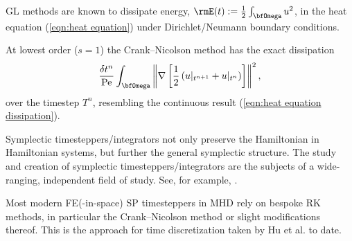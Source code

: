     \line
    
    \begin{example}
        GL methods are known to dissipate energy, $\rmE(t)  :=  \frac{1}{2}\int_{\bfOmega}u^{2}$, in the heat equation (\ref{eqn:heat equation}) under Dirichlet/Neumann boundary conditions.
        
        At lowest order ($s  =  1$) the Crank--Nicolson method has the exact dissipation
        \begin{equation}\label{eqn:heat equation dissipation implicit midpoint}
            \frac{\delta t^{n}}{\rmPe}\int_{\bfOmega}\left\|\nabla\left[\frac{1}{2}\left(u|_{t^{n + 1}} + u|_{t^{n}}\right)\right]\right\|^{2},
        \end{equation}
        over the timestep $T^{n}$, resembling the continuous result (\ref{eqn:heat equation dissipation}).
    \end{example}
    
    \begin{example}
        Symplectic timesteppers/integrators not only preserve the Hamiltonian in Hamiltonian systems, but further the general symplectic structure. The study and creation of symplectic timesteppers/integrators are the subjects of a wide-ranging, independent field of study. See, for example, \cite{Hairer_Lubich_Wanner_2006}.
    \end{example}
    
    \line

    Most modern FE(-in-space) SP timesteppers in MHD rely on bespoke RK methods, in particular the Crank--Nicolson method or slight modifications thereof. This is the approach for time discretization taken by Hu et al. to date. \cite{Hu_Lee_Xu_2021, Laakmann_Hu_Farrell_2022}
    